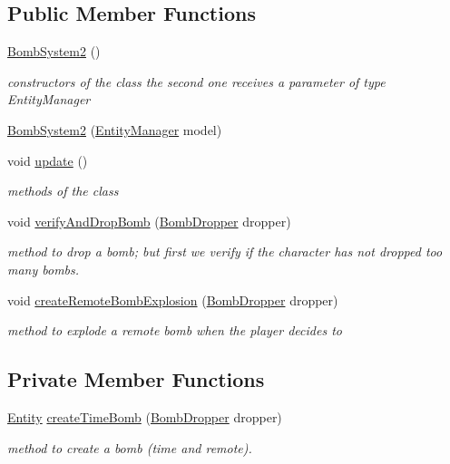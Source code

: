 \subsection*{Public Member Functions}
\begin{DoxyCompactItemize}
\item 
\hyperlink{classbr_1_1unb_1_1unbomber_1_1systems_1_1_bomb_system2_a729f54b3d84de6a9469800e06f0dad64}{Bomb\+System2} ()
\begin{DoxyCompactList}\small\item\em constructors of the class the second one receives a parameter of type Entity\+Manager \end{DoxyCompactList}\item 
\hyperlink{classbr_1_1unb_1_1unbomber_1_1systems_1_1_bomb_system2_a5b8d79e24c59deb763f29ef8214f74e1}{Bomb\+System2} (\hyperlink{interfacebr_1_1unb_1_1unbomber_1_1core_1_1_entity_manager}{Entity\+Manager} model)
\item 
void \hyperlink{classbr_1_1unb_1_1unbomber_1_1systems_1_1_bomb_system2_a0b777b9105d3c81194976ab67f05248d}{update} ()
\begin{DoxyCompactList}\small\item\em methods of the class \end{DoxyCompactList}\item 
void \hyperlink{classbr_1_1unb_1_1unbomber_1_1systems_1_1_bomb_system2_ac2e0dd81ff58129616f44ff7b28a2819}{verify\+And\+Drop\+Bomb} (\hyperlink{classbr_1_1unb_1_1unbomber_1_1component_1_1_bomb_dropper}{Bomb\+Dropper} dropper)
\begin{DoxyCompactList}\small\item\em method to drop a bomb; but first we verify if the character has not dropped too many bombs. \end{DoxyCompactList}\item 
void \hyperlink{classbr_1_1unb_1_1unbomber_1_1systems_1_1_bomb_system2_a0f29c55fd386851f8f2832a6b528446b}{create\+Remote\+Bomb\+Explosion} (\hyperlink{classbr_1_1unb_1_1unbomber_1_1component_1_1_bomb_dropper}{Bomb\+Dropper} dropper)
\begin{DoxyCompactList}\small\item\em method to explode a remote bomb when the player decides to \end{DoxyCompactList}\end{DoxyCompactItemize}
\subsection*{Private Member Functions}
\begin{DoxyCompactItemize}
\item 
\hyperlink{classbr_1_1unb_1_1unbomber_1_1core_1_1_entity}{Entity} \hyperlink{classbr_1_1unb_1_1unbomber_1_1systems_1_1_bomb_system2_a68fb0b5662dcce6e109b3fa796ec741f}{create\+Time\+Bomb} (\hyperlink{classbr_1_1unb_1_1unbomber_1_1component_1_1_bomb_dropper}{Bomb\+Dropper} dropper)
\begin{DoxyCompactList}\small\item\em method to create a bomb (time and remote). \end{DoxyCompactList}\end{DoxyCompactItemize}
